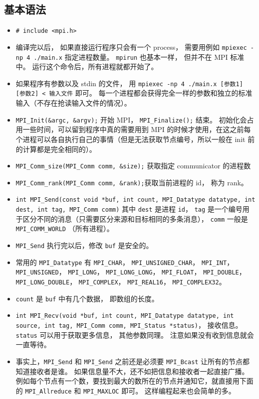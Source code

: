 \subsection{基本语法}
\begin{itemize}
\item \verb|# include <mpi.h>|
\item 编译完以后， 如果直接运行程序只会有一个 process， 需要用例如 \verb|mpiexec -np 4 ./main.x| 指定进程数量。 \verb|mpirun| 也基本一样， 但并不在 MPI 标准中。 运行这个命令后，所有进程就都开始了。
\item 如果程序有参数以及 stdin 的文件， 用 \verb`mpiexec -np 4 ./main.x [参数1] [参数2] < 输入文件` 即可。 每一个进程都会获得完全一样的参数和独立的标准输入（不存在抢读输入文件的情况）。
\item \verb|MPI_Init(&argc, &argv);| 开始 MPI， \verb|MPI_Finalize();| 结束。 初始化会占用一些时间，可以留到程序中真的需要用到 MPI 的时候才使用，在这之前每个进程可以各自执行自己的事情（但是无法获取节点编号，所以一般在 init 前的计算都是完全相同的）。
\item \verb|MPI_Comm_size(MPI_Comm comm, &size);| 获取指定 communicator 的进程数
\item \verb|MPI_Comm_rank(MPI_Comm comm, &rank);|获取当前进程的 id， 称为 rank。
\item \verb|int MPI_Send(const void *buf, int count, MPI_Datatype datatype, int dest, int tag, MPI_Comm comm)| 其中 \verb|dest| 是进程 \verb|id|， \verb|tag| 是一个编号用于区分不同的消息（只需要区分来源和目标相同的多条消息）， \verb|comm| 一般是 \verb|MPI_COMM_WORLD| （所有进程）。
\item \verb`MPI_Send` 执行完以后，修改 \verb`buf` 是安全的。
\item 常用的 \verb|MPI_Datatype| 有 \verb|MPI_CHAR|， \verb|MPI_UNSIGNED_CHAR|， \verb|MPI_INT|， \verb|MPI_UNSIGNED|， \verb|MPI_LONG|， \verb|MPI_LONG_LONG|， \verb|MPI_FLOAT|， \verb|MPI_DOUBLE|， \verb|MPI_LONG_DOUBLE|， \verb|MPI_COMPLEX|， \verb|MPI_REAL16|， \verb|MPI_COMPLEX32|。
\item \verb|count| 是 \verb|buf| 中有几个数据， 即数组的长度。
\item \verb|int MPI_Recv(void *buf, int count, MPI_Datatype datatype, int source, int tag, MPI_Comm comm, MPI_Status *status)|， 接收信息。 \verb|status| 可以用于获取更多信息， 其他参数同理。 注意如果没有收到信息就会一直等待。
\item 事实上，\verb`MPI_Send` 和 \verb`MPI_Send` 之前还是必须要 \verb`MPI_Bcast` 让所有的节点都知道接收者是谁。 如果信息量不大，还不如把信息和接收者一起直接广播。例如每个节点有一个数，要找到最大的数所在的节点并通知它，就直接用下面的 \verb`MPI_Allreduce` 和 \verb`MPI_MAXLOC` 即可。 这样编程起来也会简单的多。

\end{itemize}

